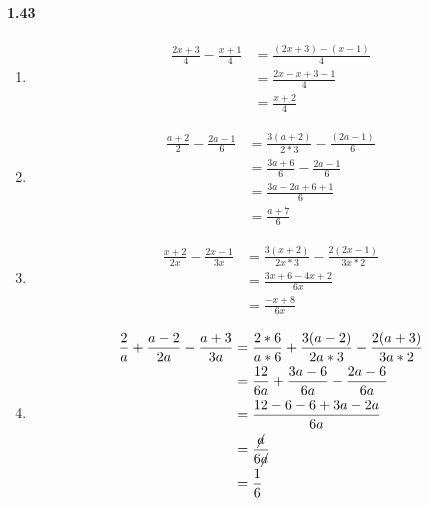 \documentclass{article}
\newcommand\litem[1]{\item{\bfseries#1\space}}
\begin{document}
\paragraph{1.43}
\begin{enumerate}[label=\emph{\alph*})]
\litem{
\begin{align*}
  \frac{2x + 3}{4} - \frac{x + 1}{4} &= \frac{(2x + 3) - (x - 1)}{4} \\
  &= \frac{2x - x + 3 - 1}{4} \\
  &= \frac{x + 2}{4} 
\end{align*}
}
\litem{
  \begin{align*}
    \frac{a + 2}{2} - \frac{2a - 1}{6} &= \frac{3\left(a + 2 \right)}{2 * 3} - \frac{(2a - 1)}{6} \\
    &= \frac{3a + 6}{6} - \frac{2a - 1}{6} \\
    &= \frac{3a - 2a + 6 + 1}{6} \\
    &= \frac{a + 7}{6}
  \end{align*}
  }
\litem{
\begin{align*}
    \frac{x + 2}{2x} - \frac{2x - 1}{3x} &= \frac{3(x + 2)}{2x * 3} - \frac{2(2x - 1)}{3x * 2} \\
    &= \frac{3x + 6 - 4x + 2}{6x} \\
    &= \frac{-x + 8}{6x}
\end{align*}
}
\litem{
\begin{align*}
    \frac{2}{a} + \frac{a - 2}{2a} - \frac{a + 3}{3a} &= \frac{2 * 6}{a * 6} + \frac{3(a - 2)}{2a * 3} - \frac{2(a + 3)}{3a * 2} \\
    &= \frac{12}{6a} + \frac{3a - 6}{6a} - \frac{2a - 6}{6a} \\
    &= \frac{12 - 6 - 6 + 3a - 2a}{6a} \\
    &= \frac{\cancel{a}}{6\cancel{a}} \\
    &= \frac{1}{6}
\end{align*}
}
\end{enumerate}
\end{document}
